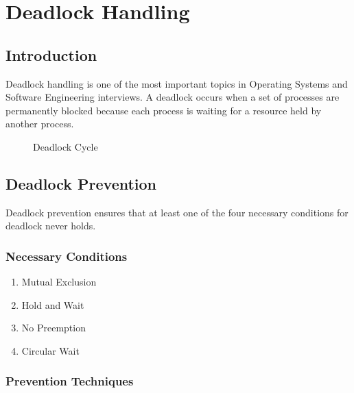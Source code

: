 \chapter{Deadlock Handling}

\section{Introduction}

Deadlock handling is one of the most important topics in Operating Systems and Software Engineering interviews. A deadlock occurs when a set of processes are permanently blocked because each process is waiting for a resource held by another process.

\begin{figure}[H]
\centering
{}
\caption{Deadlock Cycle}
\end{figure}

\section{Deadlock Prevention}

Deadlock prevention ensures that at least one of the four necessary conditions for deadlock never holds.

\subsection{Necessary Conditions}

\begin{enumerate}
\item Mutual Exclusion
\item Hold and Wait
\item No Preemption
\item Circular Wait
\end{enumerate}

\subsection{Prevention Techniques}

